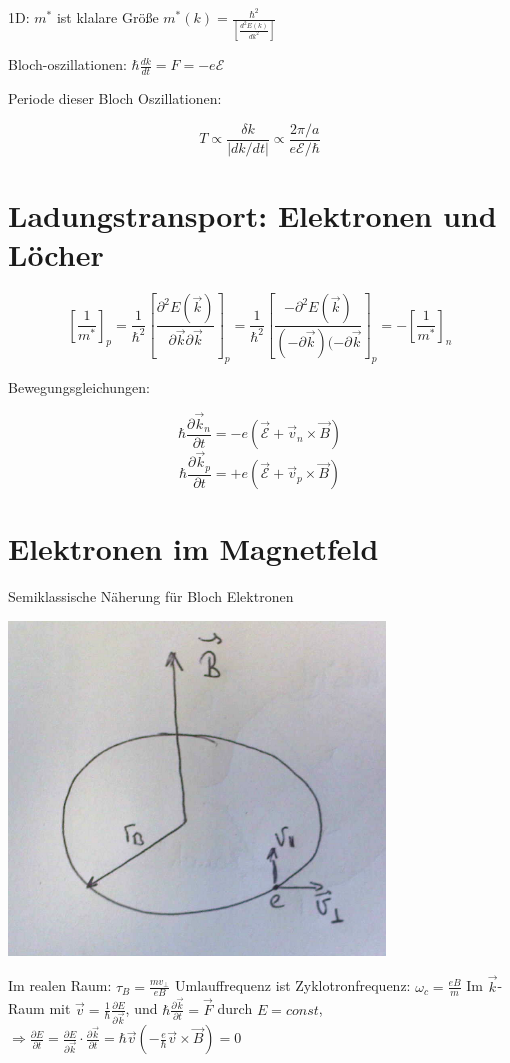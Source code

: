 1D: \(m^*\) ist klalare Größe \(m^*(k) = \frac{\hbar^2}{[\frac{d^2E(k)}{dk^2}]}\)

Bloch-oszillationen: \(\hbar \frac{dk}{dt} = F = -e\mathcal E\)


Periode dieser Bloch Oszillationen:

\[T\propto \frac{\delta k}{|dk/dt|}\propto \frac{2\pi/a}{e\mathcal E/\hbar}\]


\section{Ladungstransport: Elektronen und Löcher}

\[\left[\frac{1}{m^*}\right]_{p}=\frac{1}{\hbar^2}\left[\frac{\partial^2 E(\vec k)}{\partial \vec k\partial \vec k}\right]_{p}=\frac{1}{\hbar^2}\left[\frac{-\partial^2 E(\vec k)}{(-\partial \vec k)(-\partial \vec k}\right]_{p} = -\left[\frac{1}{m^*}\right]_n \]


Bewegungsgleichungen: 

\[\hbar \frac{\partial \vec k_n}{\partial t} = -e(\mathcal{\vec E} + \vec v_n\times\vec B)\]
\[\hbar \frac{\partial \vec k_p}{\partial t} = +e(\mathcal {\vec E} + \vec v_p\times\vec B)\]


\section{Elektronen im Magnetfeld}

Semiklassische Näherung für Bloch Elektronen

\includegraphics[width=0.75\textwidth]{kap10_04.png}

Im realen Raum: \(\tau_B = \frac{m v_\bot}{eB}\)
Umlauffrequenz ist Zyklotronfrequenz: \(\omega_c = \frac{eB}{m}\)
Im \(\vec k\)-Raum mit \(\vec v = \frac{1}{\hbar }\frac{\partial E}{\partial \vec k}\), und \(\hbar \frac{\partial \vec k}{\partial t} = \vec F\)
durch \(E=const\), \(\Rightarrow \frac{\partial E}{\partial t} = \frac{\partial E}{\partial \vec k}\cdot\frac{\partial \vec k}{\partial t} = \hbar\vec v ( - \frac{e}{\hbar}\vec v \times\vec B) = 0\)

